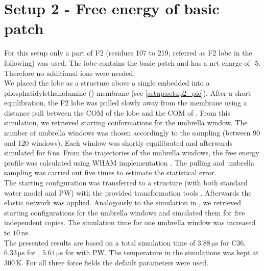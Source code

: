 \section{Setup 2 - Free energy of basic patch}
\label{setup:setup2}
For this setup only a part of F2 (residues 107 to 219, referred as F2 lobe in the following) was used. The lobe contains the basic patch and has a net charge of -5. Therefore no additional ions were needed.\\
We placed the lobe as a \charmm{} structure above a single \pip{} embedded into a phosphatidylethanolamine (\pope{}) membrane (see \autoref{setup:setup2_pic}). After a short equilibration, the F2 lobe was pulled slowly away from the membrane using a distance pull between the COM of the lobe and the COM of \pip{}. From this simulation, we retrieved starting conformations for the umbrella window. The number of umbrella windows was chosen accordingly to the sampling (between 90 and 120 windows). Each window was shortly equilibrated and afterwards simulated for $6\,\si{\nano\second}$.  From the trajectories of the umbrella windows, the free energy profile was calculated using \gromacs{} WHAM implementation \autocite{gromacsWHAM}. The pulling and umbrella sampling was carried out five times to estimate the statistical error.\\
The starting configuration was transferred to a \martini{} structure (with both standard water model and PW) with the provided transformation tools \autocite{backwardpy}. Afterwards the elastic network was applied. Analogously to the simulation in \charmm{}, we retrieved starting configurations for the umbrella windows and simulated them for five independent copies. The simulation time for one umbrella window was increased to $10\,\si{\nano\second}$.\\
The presented results are based on a total simulation time of $3.88\,\si{\micro\second}$ for C36, $6.33\,\si{\micro\second}$ for \martini{}, $5.64\,\si{\micro\second}$ for \martini{} with PW. The temperature in the simulations was kept at $300\,\si{\kelvin}$. For all three force fields the default parameters were used.
%
%
%

